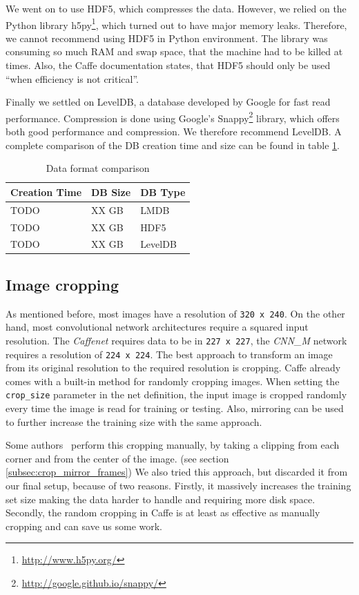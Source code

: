 We went on to use HDF5, which compresses the data.
However, we relied on the Python library h5py\footnote{\url{http://www.h5py.org/}}, which turned out to have major memory leaks.
Therefore, we cannot recommend using HDF5 in Python environment.
The library was consuming so much RAM and swap space, that the machine had to be killed at times.
Also, the Caffe documentation states, that HDF5 should only be used ``when efficiency is not critical''.

Finally we settled on LevelDB, a database developed by Google for fast read performance.
Compression is done using Google's Snappy\footnote{\url{http://google.github.io/snappy/}} library, which offers both good performance and compression.
We therefore recommend LevelDB. A complete comparison of the DB creation time and size can be found in table \ref{table:databases}.

\begin{table}[H]
\centering
\caption{Data format comparison}
\label{table:databases}
\begin{tabular}{lll}
\toprule
Creation Time & DB Size  & DB Type \\ \midrule
TODO  & XX GB & LMDB \\
TODO  & XX GB & HDF5 \\
TODO  & XX GB & LevelDB \\
\bottomrule
\end{tabular}
\end{table}

\subsection{Image cropping}
As mentioned before, most images have a resolution of \texttt{320 x 240}.
On the other hand, most convolutional network architectures require a squared input resolution.
The \emph{Caffenet} requires data to be in \texttt{227 x 227}, the \emph{CNN\_M} network requires a resolution of \texttt{224 x 224}.
The best approach to transform an image from its original resolution to the required resolution is cropping.
Caffe already comes with a built-in method for randomly cropping images.
When setting the \texttt{crop\_size} parameter in the net definition, the input image is cropped randomly every time the image is read for training or testing.
Also, mirroring can be used to further increase the training size with the same approach.

Some authors~\cite{ye2015evaluating} perform this cropping manually, by taking a clipping from each corner and from the center of the image. (see section \ref{subsec:crop_mirror_frames})
We also tried this approach, but discarded it from our final setup, because of two reasons.
Firstly, it massively increases the training set size making the data harder to handle and requiring more disk space.
Secondly, the random cropping in Caffe is at least as effective  as manually cropping and can save us some work.


